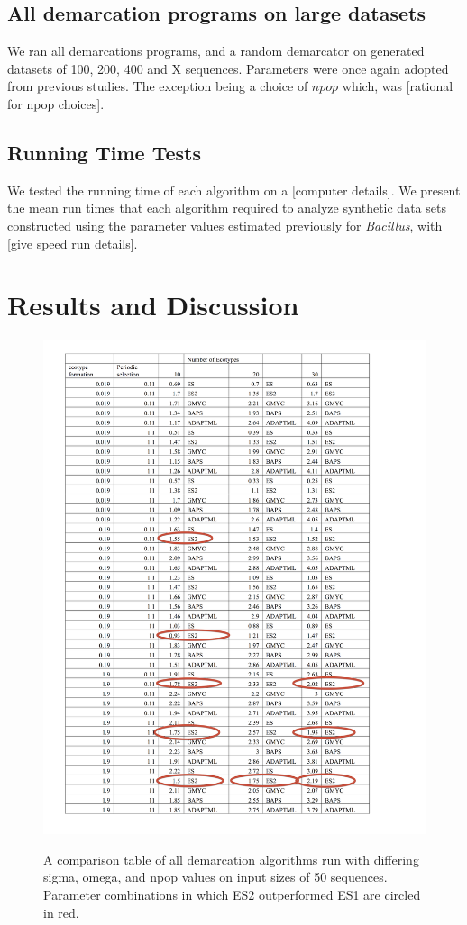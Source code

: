 \subsection*{All demarcation programs on large datasets}
We ran all demarcations programs, and a random demarcator on generated datasets of 100, 200, 400 and X sequences.
Parameters were once again adopted from previous studies.
The exception being a choice of $npop$ which, was [rational for npop choices].

\subsection*{Running Time Tests}
We tested the running time of each algorithm on a [computer details].
We present the mean run times that each algorithm required to analyze synthetic data sets constructed using the parameter values estimated previously for \emph{Bacillus}, with [give speed run details].

\section{Results and Discussion}

\begin{figure}[h!]
  \caption[Demarcation comparison table for small inputs (nu = 50).]{A comparison table of all demarcation algorithms run with differing sigma, omega, and npop values on input sizes of 50 sequences. Parameter combinations in which ES2 outperformed ES1 are circled in red.}
  \centering
    \includegraphics{images/ComparisonTable1.png}
    \label{fig:ComparisonSmall}
\end{figure}

